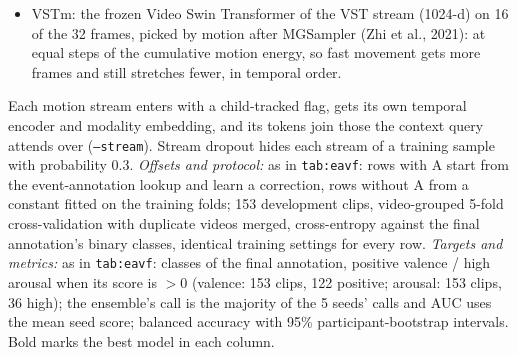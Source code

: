 \documentclass[11pt]{article}
\newcommand{\code}[1]{\texttt{#1}}
\begin{document}
\begin{table}[!htbp]
{\begin{itemize}
  \item VSTm: the frozen Video Swin Transformer of the VST stream (1024-d) on 16 of the 32 frames, picked by motion after MGSampler (Zhi et al., 2021): at equal steps of the cumulative motion energy, so fast movement gets more frames and still stretches fewer, in temporal order.
\end{itemize}
Each motion stream enters with a child-tracked flag, gets its own temporal encoder and modality embedding, and its tokens join those the context query attends over (\code{--stream}). Stream dropout hides each stream of a training sample with probability 0.3.
\emph{Offsets and protocol:} as in \code{tab:eavf}: rows with A start from the event-annotation lookup and learn a correction, rows without A from a constant fitted on the training folds; 153 development clips, video-grouped 5-fold cross-validation with duplicate videos merged, cross-entropy against the final annotation's binary classes, identical training settings for every row.
\emph{Targets and metrics:} as in \code{tab:eavf}: classes of the final annotation, positive valence / high arousal when its score is $> 0$ (valence: 153 clips, 122 positive; arousal: 153 clips, 36 high); the ensemble's call is the majority of the 5 seeds' calls and AUC uses the mean seed score; balanced accuracy with 95\% participant-bootstrap intervals. Bold marks the best model in each column.}
\end{table}
\end{document}
